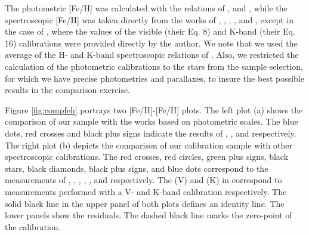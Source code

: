 \documentclass{aa}
\begin{document}
The photometric [Fe/H] was calculated with the relations of \citet{Bonfils-2005}, \citet{Schlaufman-2010} and \citet{Johnson-2012}, while the spectroscopic [Fe/H] was taken directly from the works of  \citet{Rojas-Ayala-2012}, \citet{Onehag-2012}, \citet{Terrien-2012}, \citet{Newton-2013}, and \citet{Mann-2013b}, except in the case of \citet{Mann-2013a}, where the values of the visible (their Eq. 8) and K-band (their Eq. 16) calibrations were provided directly by the author. We note that we used the average of the H- and K-band spectroscopic relations of \citet{Terrien-2012}. Also, we restricted the calculation of the photometric calibrations to the stars from the sample selection, for which we have precise photometries and parallaxes, to insure the best possible results in the comparison exercise.

Figure \ref{fig:compfeh} portrays two [Fe/H]-[Fe/H] plots. The left plot (a) shows the comparison of our sample with the works based on photometric scales. The blue dots, red crosses and black plus signs indicate the results of \citet{Bonfils-2005}, \citet{Schlaufman-2010}, and \citet{Johnson-2012} respectively. The right plot (b) depicts the comparison of our calibration sample with other spectroscopic calibrations. The red crosses, red circles, green plus signs, black stars, black diamonds, black plus signs, and blue dots correspond to the measurements of \citet{Rojas-Ayala-2012}, \citet{Onehag-2012}, \citet{Terrien-2012}, \citet{Mann-2013a}, \citet{Mann-2013b}, and \citet{Newton-2013} respectively. The (V) and (K) in \citet{Mann-2013a} correspond to measurements performed with a V- and K-band calibration respectively. The solid black line in the upper panel of both plots defines an identity line. The lower panels show the residuals. The dashed black line marks the zero-point of the calibration.
\end{document}
